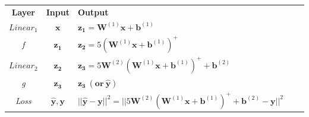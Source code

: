 \documentclass{article}
\begin{document}
\begin{enumerate}[(a)]
\begin{tcolorbox}
          \centering
          \begin{tabular}{|c|c|l|cc}
            \cline{1-3}
            \textbf{Layer}                                  & \textbf{Input}    & \textbf{Output}         &  & \\
            \cline{1-3}
            \textit{$Linear_1$}                             & $\bm{x}$          &
            $\bm{z_1}=\bm{W}^{(1)}\bm{x}+\bm{b}^{(1)}$      &                   &                              \\ \cline{1-3}
            \textit{f}                                      & $\bm{z_1}$        &
            $\bm{z_2}=5(\bm{W}^{(1)}\bm{x}+\bm{b}^{(1)})^+$ &                   &                              \\
            \cline{1-3}
            \textit{$Linear_2$}                             & $\bm{z_2}$        &
            $\bm{z_3}=5\bm{W}^{(2)}(\bm{W}^{(1)}\bm{x}+\bm{b}^{(1)})^++\bm{b}^{(2)}$
                                                            &                   &                              \\ \cline{1-3}
            \textit{g}                                      & $\bm{z_3}$        & $\bm{z_3~(or~\hat{y})}$
                                                            &                   &                              \\ \cline{1-3}
            \textit{Loss}                                   & $\bm{\hat{y}, y}$ &
            $||\bm{\hat{y}-y}||^2=||5\bm{W}^{(2)}(\bm{W}^{(1)}\bm{x}+\bm{b}^{(1)})^++\bm{b}^{(2)}-\bm{y}||^2$
                                                            &                   &                              \\ \cline{1-3}
          \end{tabular}
        \end{tcolorbox}


\end{enumerate}
\end{document}
